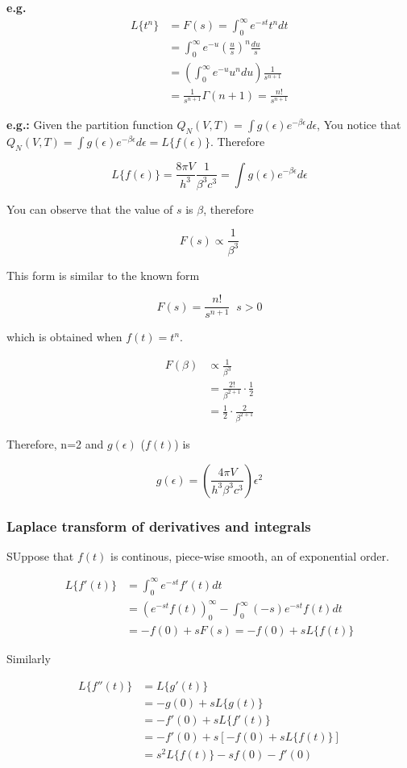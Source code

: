 \textbf{e.g.}
\begin{align*}
    L\{t^n\} &= F(s) = \int_0^\infty{e^{-st} t^n dt} \\
    &= \int_0^\infty{e^{-u} \left(\frac{u}{s}\right)^n \frac{du}{s}}\\
    &= \left(\int_0^\infty{e^{-u} u^n du}\right) \frac{1}{s^{n+1}}\\
    &= \frac{1}{s^{n+1}} \Gamma(n+1) = \frac{n!}{s^{n+1}}
\end{align*}

\textbf{e.g.:} Given the partition function $Q_N(V, T) = \int{g(\epsilon) e^{-\beta \epsilon} d\epsilon}$, You notice that $Q_N(V, T) = \int{g(\epsilon) e^{-\beta \epsilon} d\epsilon} = L\{f(\epsilon)\}$. Therefore

$$
L\{f(\epsilon)\} = \frac{8 \pi V}{h^3} \frac{1}{\beta^3 c^3} = \int{g(\epsilon) e^{-\beta \epsilon} d\epsilon}
$$

You can observe that the value of $s$ is $\beta$, therefore

$$
F(s) \propto \frac{1}{\beta^3}
$$

This form is similar to the known form

$$
F(s) = \frac{n!}{s^{n+1}} \;\; s>0
$$

which is obtained when $f(t) = t^n$.

\begin{align*}
    F(\beta) &\propto \frac{1}{\beta^3} \\
    &= \frac{2!}{\beta^{2+1}} \cdot \frac{1}{2} \\
    &= \frac{1}{2} \cdot \frac{2}{\beta^{2+1}}
\end{align*}

Therefore, n=2 and $g(\epsilon)$ ($f(t)$) is

$$
g(\epsilon) = \left(\frac{4\pi V}{h^3 \beta^3 c^3}\right) \epsilon^2
$$

\subsubsection{Laplace transform of derivatives and integrals}

SUppose that $f(t)$ is continous, piece-wise smooth, an of exponential order.


\begin{align*}
    L\{f'(t)\} &= \int_0^\infty{e^{-st}f'(t)dt} \\
    &= \left(e^{-st} f(t)\right)_0^\infty - \int_0^\infty{(-s) e^{-st} f(t) dt} \\
    &=  - f(0) + s F(s) = -f(0) + sL\{f(t)\}
\end{align*}

Similarly

\begin{align*}
    L\{f''(t)\} &= L\{g'(t)\}\\
    &= -g(0)  + s L\{g(t)\} \\
    &= - f'(0) + s L\{f'(t)\} \\
    &= -f'(0) + s\left[-f(0) + s L\{f(t)\} \right]\\
    &= s^2 L\{f(t)\} - sf(0) - f'(0)
\end{align*}

